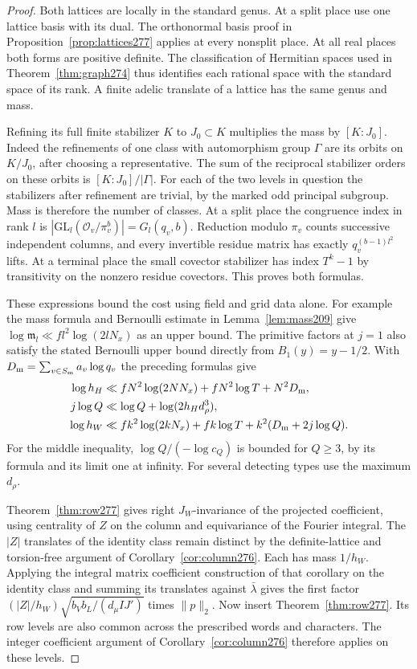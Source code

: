 \documentclass[a4paper,11pt]{article}
\theoremstyle{definition}
\theoremstyle{remark}
\numberwithin{equation}{section}
\begin{document}
\begin{proof}
Both lattices are locally in the standard genus. At a split
place use one lattice basis with its dual. The orthonormal
basis proof in Proposition~\ref{prop:lattices277} applies at
every nonsplit place. At all real places both forms are positive
definite. The classification of Hermitian spaces used in
Theorem~\ref{thm:graph274} thus identifies each rational space
with the standard space of its rank. A finite adelic translate
of a lattice has the same genus and mass.

Refining its full finite stabilizer \(K\) to \(J_0\subset K\)
multiplies the mass by \([K:J_0]\). Indeed the refinements of
one class with automorphism group \(\Gamma\) are its orbits
on \(K/J_0\), after choosing a representative. The sum of the
reciprocal stabilizer orders on these orbits is
\([K:J_0]/|\Gamma|\). For each of the two levels in question
the stabilizers after refinement are trivial, by the marked
odd principal subgroup. Mass is therefore the number of
classes. At a split place the congruence index in rank \(l\)
is \(|\mathrm{GL}_l(\mathcal O_v/\pi_v^b)|=G_l(q_v,b)\).
Reduction modulo \(\pi_v\) counts successive independent
columns, and every invertible residue matrix has exactly
\(q_v^{(b-1)l^2}\) lifts. At a terminal place the small
covector stabilizer has index \(T^k-1\) by transitivity on
the nonzero residue covectors. This proves both formulas.

These expressions bound the cost using field and grid data
alone. For example the mass formula and Bernoulli estimate in
Lemma~\ref{lem:mass209} give
\(\log\mathfrak m_l\ll f l^2\log(2lN_x)\) as an upper
bound. The primitive factors at \(j=1\) also satisfy the
stated Bernoulli upper bound directly from \(B_1(y)=y-1/2\).
With \(D_{\rm m}=\sum_{v\in S_{\rm m}}a_v\log q_v\) the
preceding formulas give
\begin{align*}
 \log h_H&\ll fN^2\log(2NN_x)+fN^2\log T+N^2D_{\rm m},\\
 j\log Q&\ll \log Q+\log(2h_H d_\rho^3),\\
 \log h_W&\ll fk^2\log(2kN_x)+fk\log T
                         + k^2(D_{\rm m}+2j\log Q).
\end{align*}
For the middle inequality, \(\log Q/(-\log c_Q)\) is bounded
for \(Q\ge3\), by its formula and its limit one at infinity.
For several detecting types use the maximum \(d_\rho\).

Theorem~\ref{thm:row277} gives right \(J_W\)-invariance of
the projected coefficient, using centrality of \(Z\) on the
column and equivariance of the Fourier integral. The \(|Z|\)
translates of the identity class remain distinct by the
definite-lattice and torsion-free argument of
Corollary~\ref{cor:column276}. Each has mass \(1/h_W\).
Applying the integral matrix coefficient construction of that
corollary on the identity class and summing its translates
against \(\bar\lambda\) gives the first factor
\((|Z|/h_W)\sqrt{b_Vb_L/(d_\mu I J')}\) times \(\|p\|_2\).
Now insert Theorem~\ref{thm:row277}. Its row levels are also
common across the prescribed words and characters. The
integer coefficient argument of Corollary~\ref{cor:column276}
therefore applies on these levels.
\end{proof}
\end{document}
